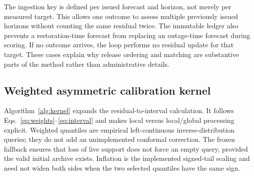 \documentclass[pdflatex,sn-mathphys-num]{sn-jnl}
\begin{document}
The ingestion key is defined per issued forecast and horizon, not merely per measured target. This allows one outcome to assess multiple previously issued horizons without counting the same residual twice. The immutable ledger also prevents a restoration-time forecast from replacing an outage-time forecast during scoring. If no outcome arrives, the loop performs no residual update for that target. These cases explain why release ordering and matching are substantive parts of the method rather than administrative details.

\subsection{Weighted asymmetric calibration kernel}
Algorithm~\ref{alg:kernel} expands the residual-to-interval calculation. It follows Eqs.~\eqref{eq:weights}--\eqref{eq:interval} and makes local versus local/global processing explicit. Weighted quantiles are empirical left-continuous inverse-distribution queries; they do not add an unimplemented conformal correction. The frozen fallback ensures that loss of live support does not force an empty query, provided the valid initial archive exists. Inflation is the implemented signed-tail scaling and need not widen both sides when the two selected quantiles have the same sign.
\end{document}
